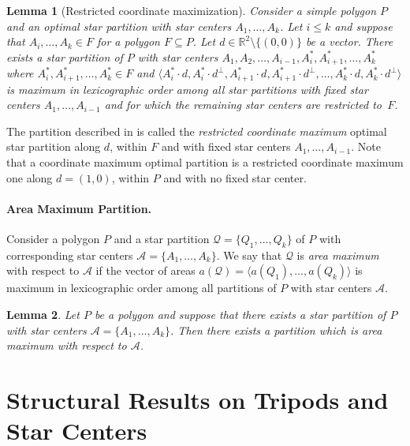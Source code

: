 \documentclass[10pt,a4paper]{article}
\newtheorem{lemma}{Lemma}[section]
\newcommand{\RR}{\mathbb{R}}
\begin{document}
\begin{lemma}[Restricted coordinate maximization]\label{lem:coordmaxsubset}
Consider a simple polygon $P$ and an optimal star partition with star centers $A_1,\ldots,A_k$.
Let $i\leq k$ and suppose that $A_i,\ldots,A_k\in F$ for a polygon $F\subseteq P$. 
Let $d\in\RR^2 \setminus \{(0,0)\}$ be a vector.
There exists a star partition of $P$ with star centers $A_1,A_2,\ldots,A_{i-1},A^*_i,A^*_{i+1},\ldots,A^*_k$ where $A^*_i,A^*_{i+1},\ldots,A^*_k\in F$ and $\langle A^*_i\cdot d, A^*_i\cdot d^\perp,A^*_{i+1}\cdot d, A^*_{i+1}\cdot d^\perp,\ldots,A^*_k\cdot d,A^*_k\cdot d^\perp\rangle$ is maximum in lexicographic order among all star partitions with fixed star centers $A_1,\ldots,A_{i-1}$ and for which the remaining star centers are restricted to~$F$. 
\end{lemma}

The partition described in  is called the \emph{restricted coordinate maximum} optimal star partition along $d$, within $F$ and with fixed star centers $A_1, \dots, A_{i-1}$.
Note that a coordinate maximum optimal partition is a restricted coordinate maximum one along $d=(1,0)$, within $P$ and with no fixed star center. 


\paragraph{Area Maximum Partition.}
Consider a polygon $P$ and a star partition $\mathcal Q=\{Q_1,\ldots,Q_k\}$ of $P$ with corresponding star centers $\mathcal A=\{A_1,\ldots,A_k\}$.
We say that $\mathcal Q$ is \emph{area maximum} with respect to $\mathcal A$ if the vector of areas $a(\mathcal Q)=\langle a(Q_1),\ldots,a(Q_k)\rangle$ is maximum in lexicographic order among all partitions of $P$ with star centers $\mathcal A$.

\begin{lemma}\label{lem:areamax}
Let $P$ be a polygon and suppose that there exists a star partition of $P$ with star centers $\mathcal A=\{A_1,\ldots,A_k\}$.
Then there exists a partition which is area maximum with respect to $\mathcal A$.
\end{lemma}



\section{Structural Results on Tripods and Star Centers}
\label{sec:structure}
\end{document}
